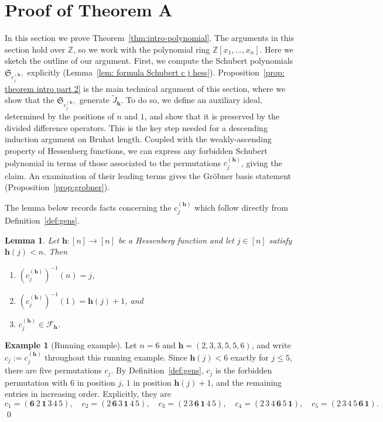 \documentclass[11pt]{amsart}
\theoremstyle{plain}
\newtheorem{lem}[thm]{Lemma}
\theoremstyle{definition}
\newtheorem{ex}[thm]{Example}
\newcommand{\hess}{{\mathbf h}}
\newcommand{\Z}{\mathbb{ Z}}           %
\newcommand{\exampleqed}{%
    {   
    \renewcommand{\qedsymbol}{$\lozenge$}%
    \qed%
    }
}
\numberwithin{equation}{section}
\begin{document}

\section{Proof of Theorem A} \label{sec:mainresults}


In this section we prove Theorem~\ref{thm:intro-polynomial}. The arguments in this section hold over $\Z$, so we work with the polynomial ring $\Z[x_1,\ldots,x_n]$. Here we sketch the outline of our argument. First, we compute the Schubert polynomials $\mathfrak{S}_{c_j^{(\hess)}}$ explicitly (Lemma~\ref{lem: formula Schubert c j hess}). 
Proposition~\ref{prop: theorem intro part 2} is the main technical argument of this section, where we show that the $\mathfrak{S}_{c_j^{(\hess)}}$ generate $\tilde{J}_\hess$. To do so, we define an auxiliary ideal, determined by the positions of $n$ and $1$, and show that it is preserved by the divided difference operators. This is the key step needed for a descending induction argument on Bruhat length. Coupled with the weakly-ascending property of Hessenberg functions, we can express any forbidden Schubert polynomial in terms of those associated to the permutations $c_j^{(\hess)}$, giving the claim. An examination of their leading terms gives the  
Gr\"obner basis statement (Proposition~\ref{prop:grobner}).




The lemma below records facts concerning the
$c_j^{(\hess)}$ which follow directly from Definition~\ref{def:gens}.

\begin{lem}\label{lemma: properties of c j hess}
Let $\hess:[n]\to [n]$ be a Hessenberg function and let $j \in [n]$ satisfy $\hess(j)<n$. Then
\begin{enumerate}
\item $(c_j^{(\hess)})^{-1}(n)=j$,
\item $(c_j^{(\hess)})^{-1}(1)=\hess(j)+1$, and 
\item $c_j^{(\hess)} \in \mathcal{F}_\hess$. 
\end{enumerate}
\end{lem} 


\begin{ex}[Running example]\label{ex: running}
    Let $n=6$ and $\hess=(2,3,3,5,5,6)$, and write $c_j:=c_j^{(\hess)}$ throughout this running example. Since $\hess(j)<6$ exactly for $j\leq5$, there are five permutations $c_j$. By Definition~\ref{def:gens}, $c_j$ is the forbidden permutation with $6$ in position $j$, $1$ in position $\hess(j)+1$, and the remaining entries in increasing order. Explicitly, they are 
    $$c_1=(\mathbf{6}\ 2\,\mathbf{1}\,3\,4\,5),\quad
    c_2=(2\,\mathbf{6}\,3\,\mathbf{1}\,4\,5),\quad
    c_3=(2\,3\,\mathbf{6}\,\mathbf{1}\,4\,5),\quad
    c_4=(2\,3\,4\,\mathbf{6}\,5\,\mathbf{1}),\quad
    c_5=(2\,3\,4\,5\,\mathbf{6}\,\mathbf{1}).$$
    \exampleqed
\end{ex}
\end{document}
